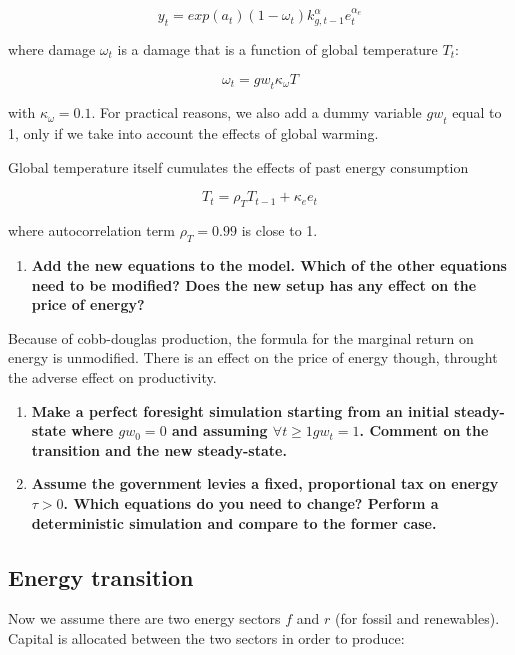 \documentclass[
  letterpaper,
  DIV=11,
  numbers=noendperiod]{scrartcl}
\providecommand{\tightlist}{%
  \setlength{\itemsep}{0pt}\setlength{\parskip}{0pt}}\usepackage{longtable,booktabs,array}
\begin{document}
\[y_t = exp(a_t) (1-\omega_t) k_{g,t-1}^{\alpha}e_t^{\alpha_e}\]

where damage \(\omega_t\) is a damage that is a function of global
temperature \(T_t\):

\[\omega_t = {gw}_t \kappa_{\omega} T\]

with \(\kappa_{\omega} =0.1\). For practical reasons, we also add a
dummy variable \({gw}_t\) equal to 1, only if we take into account the
effects of global warming.

Global temperature itself cumulates the effects of past energy
consumption

\[T_t = \rho_T T_{t-1} +  \kappa_{e}  e_t\]

where autocorrelation term \(\rho_T=0.99\) is close to 1.

\begin{enumerate}
\def\labelenumi{\arabic{enumi}.}
\setcounter{enumi}{8}
\tightlist
\item
  \textbf{Add the new equations to the model. Which of the other
  equations need to be modified? Does the new setup has any effect on
  the price of energy?}
\end{enumerate}

Because of cobb-douglas production, the formula for the marginal return
on energy is unmodified. There is an effect on the price of energy
though, throught the adverse effect on productivity.

\begin{enumerate}
\def\labelenumi{\arabic{enumi}.}
\setcounter{enumi}{9}
\item
  \textbf{Make a perfect foresight simulation starting from an initial
  steady-state where \(gw_0=0\) and assuming
  \(\forall t\geq 1 gw_t = 1\). Comment on the transition and the new
  steady-state.}
\item
  \textbf{Assume the government levies a fixed, proportional tax on
  energy \(\tau>0\). Which equations do you need to change? Perform a
  deterministic simulation and compare to the former case.}
\end{enumerate}

\subsection{Energy transition}\label{energy-transition}

Now we assume there are two energy sectors \(f\) and \(r\) (for fossil
and renewables). Capital is allocated between the two sectors in order
to produce:
\end{document}
